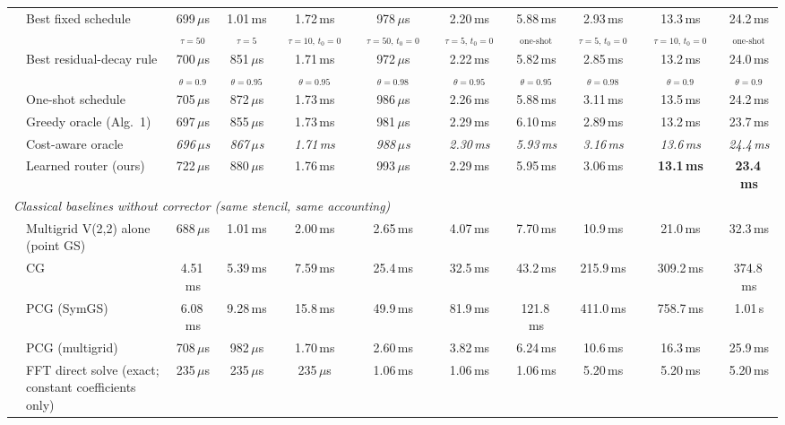 {\begin{tabular}{llccccccccc}
 & Best fixed schedule & 699\,$\mu$s$_{\tau{=}50}$ & 1.01\,ms$_{\tau{=}5}$ & 1.72\,ms$_{\tau{=}10,\,t_0{=}0}$ & 978\,$\mu$s$_{\tau{=}50,\,t_0{=}0}$ & 2.20\,ms$_{\tau{=}5,\,t_0{=}0}$ & 5.88\,ms$_{\text{one-shot}}$ & 2.93\,ms$_{\tau{=}5,\,t_0{=}0}$ & 13.3\,ms$_{\tau{=}10,\,t_0{=}0}$ & 24.2\,ms$_{\text{one-shot}}$ \\
 & Best residual-decay rule & 700\,$\mu$s$_{\theta{=}0.9}$ & 851\,$\mu$s$_{\theta{=}0.95}$ & 1.71\,ms$_{\theta{=}0.95}$ & 972\,$\mu$s$_{\theta{=}0.98}$ & 2.22\,ms$_{\theta{=}0.95}$ & 5.82\,ms$_{\theta{=}0.95}$ & 2.85\,ms$_{\theta{=}0.98}$ & 13.2\,ms$_{\theta{=}0.9}$ & 24.0\,ms$_{\theta{=}0.9}$ \\
 & One-shot schedule & 705\,$\mu$s & 872\,$\mu$s & 1.73\,ms & 986\,$\mu$s & 2.26\,ms & 5.88\,ms & 3.11\,ms & 13.5\,ms & 24.2\,ms \\
 & Greedy oracle (Alg.~1) & 697\,$\mu$s & 855\,$\mu$s & 1.73\,ms & 981\,$\mu$s & 2.29\,ms & 6.10\,ms & 2.89\,ms & 13.2\,ms & 23.7\,ms \\
 & Cost-aware oracle & \textit{696\,$\mu$s} & \textit{867\,$\mu$s} & \textit{1.71\,ms} & \textit{988\,$\mu$s} & \textit{2.30\,ms} & \textit{5.93\,ms} & \textit{3.16\,ms} & \textit{13.6\,ms} & \textit{24.4\,ms} \\
 & Learned router (ours) & 722\,$\mu$s & 880\,$\mu$s & 1.76\,ms & 993\,$\mu$s & 2.29\,ms & 5.95\,ms & 3.06\,ms & \textbf{13.1\,ms} & \textbf{23.4\,ms} \\
\midrule
\multicolumn{11}{l}{\emph{Classical baselines without corrector (same stencil, same accounting)}} \\ \midrule
 & Multigrid V(2,2) alone (point GS) & 688\,$\mu$s & 1.01\,ms & 2.00\,ms & 2.65\,ms & 4.07\,ms & 7.70\,ms & 10.9\,ms & 21.0\,ms & 32.3\,ms \\
 & CG & 4.51\,ms & 5.39\,ms & 7.59\,ms & 25.4\,ms & 32.5\,ms & 43.2\,ms & 215.9\,ms & 309.2\,ms & 374.8\,ms \\
 & PCG (SymGS) & 6.08\,ms & 9.28\,ms & 15.8\,ms & 49.9\,ms & 81.9\,ms & 121.8\,ms & 411.0\,ms & 758.7\,ms & 1.01\,s \\
 & PCG (multigrid) & 708\,$\mu$s & 982\,$\mu$s & 1.70\,ms & 2.60\,ms & 3.82\,ms & 6.24\,ms & 10.6\,ms & 16.3\,ms & 25.9\,ms \\
 & FFT direct solve (exact; constant coefficients only) & 235\,$\mu$s & 235\,$\mu$s & 235\,$\mu$s & 1.06\,ms & 1.06\,ms & 1.06\,ms & 5.20\,ms & 5.20\,ms & 5.20\,ms \\
\bottomrule
\end{tabular}}
